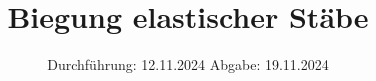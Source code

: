 

\subject{V103}
\title{Biegung elastischer Stäbe}
\date{%
  Durchführung: 12.11.2024
  \hspace{3em}
  Abgabe: 19.11.2024
}



\maketitle
\thispagestyle{empty}
\tableofcontents
\newpage






\printbibliography{}


